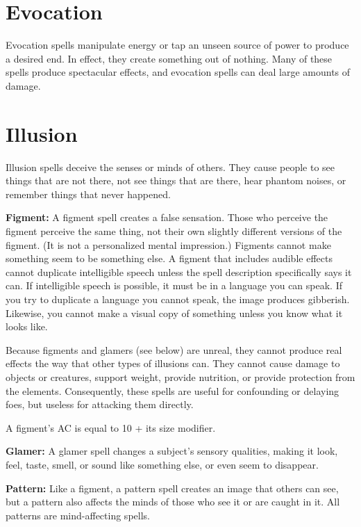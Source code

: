 \documentclass{article}
\begin{document}
\vspace{12pt}
\section*{\textbf{Evocation}}

Evocation spells manipulate energy or tap an unseen source of power to produce 
a desired end. In effect, they create something out of nothing. Many of these spells 
produce spectacular effects, and evocation spells can deal large amounts of damage.

\vspace{12pt}
\section*{\textbf{Illusion}}

Illusion spells deceive the senses or minds of others. They cause people to see 
things that are not there, not see things that are there, hear phantom noises, 
or remember things that never happened.

\textbf{Figment:} A figment spell creates a false sensation. Those who perceive 
the figment perceive the same thing, not their own slightly different versions 
of the figment. (It is not a personalized mental impression.) Figments cannot make 
something seem to be something else. A figment that includes audible effects cannot 
duplicate intelligible speech unless the spell description specifically says it 
can. If intelligible speech is possible, it must be in a language you can speak. 
If you try to duplicate a language you cannot speak, the image produces gibberish. 
Likewise, you cannot make a visual copy of something unless you know what it looks 
like.

Because figments and glamers (see below) are unreal, they cannot produce real effects 
the way that other types of illusions can. They cannot cause damage to objects 
or creatures, support weight, provide nutrition, or provide protection from the 
elements. Consequently, these spells are useful for confounding or delaying foes, 
but useless for attacking them directly. 

A figment's AC is equal to 10 + its size modifier.

\textbf{Glamer:} A glamer spell changes a subject's sensory qualities, making it 
look, feel, taste, smell, or sound like something else, or even seem to disappear.

\textbf{Pattern:} Like a figment, a pattern spell creates an image that others 
can see, but a pattern also affects the minds of those who see it or are caught 
in it. All patterns are mind-affecting spells.
\end{document}
